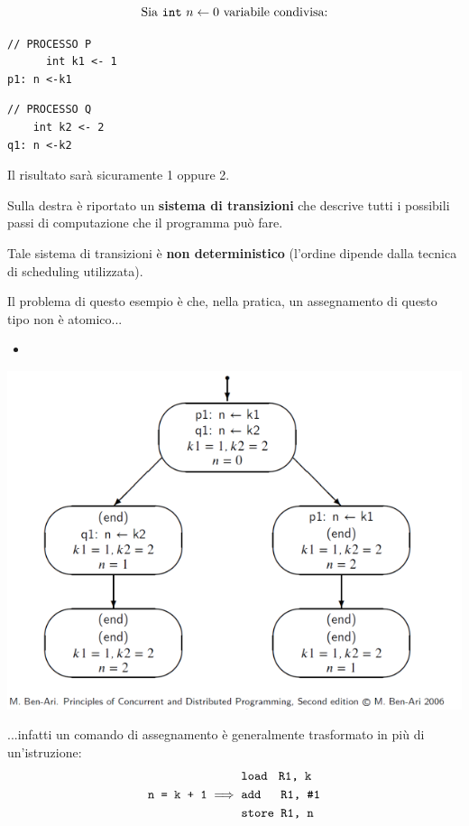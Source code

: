 \documentclass[a4paper,10pt]{article}
\begin{document}
\[\text{Sia \texttt{int} }n \leftarrow 0 \text{ variabile condivisa:}\]
\begin{multicols}{2}
 \begin{lstlisting}
// PROCESSO P
      int k1 <- 1
p1: n <-k1\end{lstlisting}
\begin{lstlisting}
// PROCESSO Q
    int k2 <- 2
q1: n <-k2\end{lstlisting}

\end{multicols}
\begin{multicols}{2}
 
Il risultato sarà sicuramente 1 oppure 2.

Sulla destra è riportato un \textbf{sistema di transizioni} che descrive tutti i possibili passi di computazione che il programma può fare.

Tale sistema di transizioni è \textbf{non deterministico} (l'ordine dipende dalla tecnica di scheduling utilizzata).\bigskip

Il problema di questo esempio è che, nella pratica, un assegnamento di questo tipo non è atomico...\smallskip

\begin{itemize}
 \item []
\end{itemize}

\includegraphics[scale = .45]{primoes}

\end{multicols}
...infatti un comando di assegnamento è generalmente trasformato in più di un'istruzione:
\[ \texttt{n = k + 1} \implies \begin{aligned}
                                &\texttt{load \,\,R1, k}\\
                                &\texttt{add \quad R1, \#1}\\
                                &\texttt{store R1, n}
                               \end{aligned}
 \]
 
\end{document}
